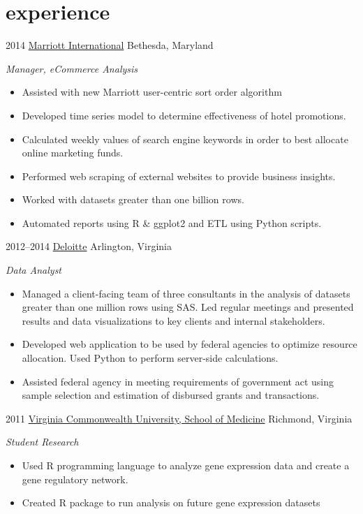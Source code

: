 \documentclass[]{friggeri-cv} %
\begin{document}

\section{experience}

\begin{entrylist}
\entry
{2014}
{\href{http://www.marriott.com/}{Marriott International}}
{Bethesda, Maryland}
{\emph{Manager, eCommerce Analysis}
\begin{itemize}
\renewcommand\labelitemi{--}
\item Assisted with new Marriott user-centric sort order algorithm
\item Developed time series model to determine effectiveness of hotel promotions. 
\item Calculated weekly values of search engine keywords in order to best allocate online marketing funds.
\item Performed web scraping of external websites to provide business insights.
\item Worked with datasets greater than one billion rows.
\item Automated reports using R \& ggplot2 and ETL using Python scripts.
\end{itemize}
}
\entry
{2012--2014}
{\href{http://www.deloitte.com/}{Deloitte}}
{Arlington, Virginia}
{\emph{Data Analyst}
\begin{itemize}
\renewcommand\labelitemi{--}
\item Managed a client-facing team of three consultants in the analysis of datasets greater than one million rows using SAS. 
Led regular meetings and presented results and data visualizations to key clients and internal stakeholders.
\item Developed web application to be used by federal agencies to optimize resource allocation. 
Used Python to perform server-side calculations.
\item Assisted federal agency in meeting requirements of government act using sample selection and estimation of disbursed grants and transactions.
\end{itemize}
}
\entry
{2011}
{\href{http://www.medschool.vcu.edu}{Virginia Commonwealth University, School of Medicine}}
{Richmond, Virginia}
{\emph{Student Research}
\begin{itemize}
\renewcommand\labelitemi{--}
\item Used R programming language to analyze gene expression data and create a gene regulatory network.
\item Created R package to run analysis on future gene expression datasets
\end{itemize}
}
\end{entrylist}
\end{document}
